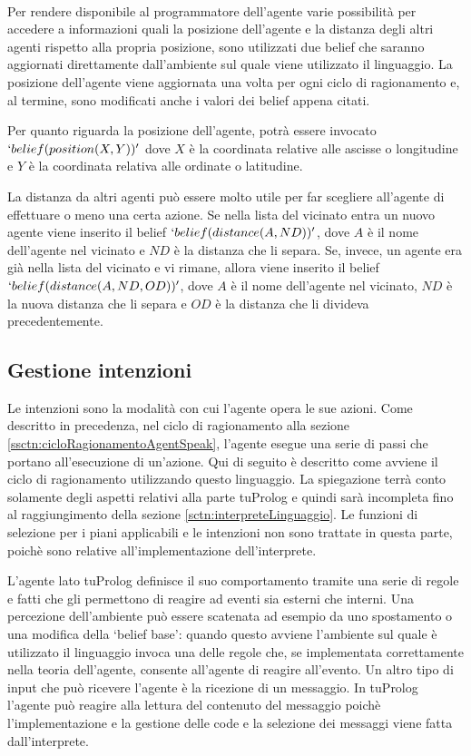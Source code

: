 \paragraph*{}
Per rendere disponibile al programmatore dell'agente varie possibilità per accedere a informazioni quali la posizione dell'agente e la distanza degli altri agenti rispetto alla propria posizione, sono utilizzati due belief che saranno aggiornati direttamente dall'ambiente sul quale viene utilizzato il linguaggio. La posizione dell'agente viene aggiornata una volta per ogni ciclo di ragionamento e, al termine, sono modificati anche i valori dei belief appena citati. 

Per quanto riguarda la posizione dell'agente, potrà essere invocato $`be\-lief(po\-si\-tion(X, Y))'$ dove $X$ è la coordinata relative alle ascisse o longitudine e $Y$ è la coordinata relativa alle ordinate o latitudine.

La distanza da altri agenti può essere molto utile per far scegliere all'agente di effettuare o meno una certa azione. Se nella lista del vicinato entra un nuovo agente viene inserito il belief $`belief(distance(A, ND))'$, dove $A$ è il nome dell'agente nel vicinato e $ND$ è la distanza che li separa. Se, invece, un agente era già nella lista del vicinato e vi rimane, allora viene inserito il belief $`belief(distance(A, ND, OD))'$, dove $A$ è il nome dell'agente nel vicinato, $ND$ è la nuova distanza che li separa e $OD$ è la distanza che li divideva precedentemente.

\subsection{Gestione intenzioni}
Le intenzioni sono la modalità con cui l'agente opera le sue azioni. Come descritto in precedenza, nel ciclo di ragionamento alla sezione \ref{ssctn:cicloRagionamentoAgentSpeak}, l'agente esegue una serie di passi che portano all'esecuzione di un'azione.
Qui di seguito è descritto come avviene il ciclo di ragionamento utilizzando questo linguaggio. La spiegazione terrà conto solamente degli aspetti relativi alla parte tuProlog e quindi sarà incompleta fino al raggiungimento della sezione \ref{sctn:interpreteLinguaggio}. Le funzioni di selezione per i piani applicabili e le intenzioni non sono trattate in questa parte, poichè sono relative all'implementazione dell'interprete.

L'agente lato tuProlog definisce il suo comportamento tramite una serie di regole e fatti che gli permettono di reagire ad eventi sia esterni che interni. Una percezione dell'ambiente può essere scatenata ad esempio da uno spostamento o una modifica della `belief base': quando questo avviene l'ambiente sul quale è utilizzato il linguaggio invoca una delle regole che, se implementata correttamente nella teoria dell'agente, consente all'agente di reagire all'evento. Un altro tipo di input che può ricevere l'agente è la ricezione di un messaggio. In tuProlog l'agente può reagire alla lettura del contenuto del messaggio poichè l'implementazione e la gestione delle code e la selezione dei messaggi viene fatta dall'interprete.

